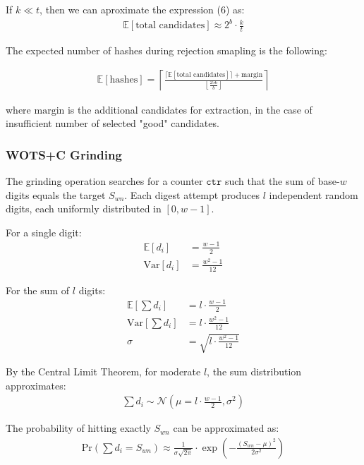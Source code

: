 If $k \ll t$, then we can aproximate the expression (6) as:
\begin{align}
    \mathbb{E}\left[\text{total candidates}\right] \approx 2^b\cdot\frac{k}{t}
\end{align}

The expected number of hashes during rejection smapling is the following: 

\begin{align}
    \mathbb{E}[\text{hashes}] = \left\lceil \frac{\lceil \mathbb{E}[\text{total candidates}] \rceil + \text{margin}}{\left\lfloor \frac{256}{b}\right\rfloor}\right\rceil
\end{align}

where $\text{margin}$ is the additional candidates for extraction, in the case of insufficient number of selected "good" candidates.

\subsubsection{WOTS+C Grinding}
The grinding operation searches for a counter $\texttt{ctr}$ such that the sum of base-$w$ digits equals the target $S_{wn}$. Each digest attempt produces $l$ independent random digits, each uniformly distributed in $[0, w-1]$.

For a single digit:
\begin{align}
    \mathbb{E}[d_i] &= \frac{w-1}{2} \\
    \text{Var}[d_i] &= \frac{w^2-1}{12}
\end{align}

For the sum of $l$ digits:
\begin{align}
    \mathbb{E}\left[\sum d_i\right] &= l \cdot \frac{w-1}{2} \\
    \text{Var}\left[\sum d_i\right] &= l \cdot \frac{w^2-1}{12} \\
    \sigma &= \sqrt{l \cdot \frac{w^2-1}{12}}
\end{align}

By the Central Limit Theorem, for moderate $l$, the sum distribution approximates:
\begin{align}
\sum d_i \sim \mathcal{N}\left(\mu = l \cdot \frac{w-1}{2}, \sigma^2\right)
\end{align}

The probability of hitting exactly $S_{wn}$ can be approximated as:
\begin{align}
    \text{Pr}\left(\sum d_i = S_{wn}\right) \approx \frac{1}{\sigma\sqrt{2\pi}} \cdot \exp\left(-\frac{(S_{wn} - \mu)^2}{2\sigma^2}\right)
\end{align}

